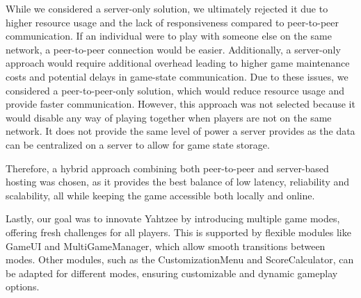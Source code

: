 \documentclass[12pt, titlepage]{article}
\begin{document}
\begin{enumerate}
  While we considered a server-only solution, we ultimately rejected it due to higher resource usage and the lack of responsiveness compared to peer-to-peer communication. If an individual were to play with someone else on the same network, a peer-to-peer connection would be easier. Additionally, a server-only approach would require additional overhead leading to higher game maintenance costs and potential delays in game-state communication. Due to these issues, we considered a peer-to-peer-only solution, which would reduce resource usage and provide faster communication. However, this approach was not selected because it would disable any way of playing together when players are not on the same network. It does not provide the same level of power a server provides as the data can be centralized on a server to allow for game state storage. 

  Therefore, a hybrid approach combining both peer-to-peer and server-based hosting was chosen, as it provides the best balance of low latency, reliability and scalability, all while keeping the game accessible both locally and online. 

  Lastly, our goal was to innovate Yahtzee by introducing multiple game modes, offering fresh challenges for all players. This is supported by flexible modules like GameUI and MultiGameManager, which allow smooth transitions between modes. Other modules, such as the CustomizationMenu and ScoreCalculator, can be adapted for different modes, ensuring customizable and dynamic gameplay options.
\end{enumerate}
\end{document}
